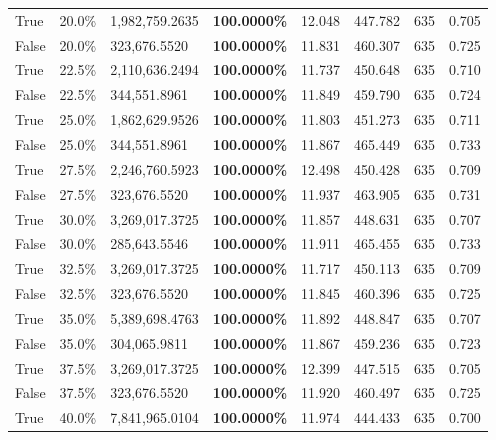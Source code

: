 \begin{table}[H]
\begin{tabular}{lllrllll}
\cline{1-8}
True & 20.0\% & 1,982,759.2635 & \bfseries \color{red} 100.0000\% & 12.048 & 447.782 & 635 & 0.705 \\
\cline{1-8}
False & 20.0\% & 323,676.5520 & \bfseries \color{red} 100.0000\% & 11.831 & 460.307 & 635 & 0.725 \\
\cline{1-8}
True & 22.5\% & 2,110,636.2494 & \bfseries \color{red} 100.0000\% & 11.737 & 450.648 & 635 & 0.710 \\
\cline{1-8}
False & 22.5\% & 344,551.8961 & \bfseries \color{red} 100.0000\% & 11.849 & 459.790 & 635 & 0.724 \\
\cline{1-8}
True & 25.0\% & 1,862,629.9526 & \bfseries \color{red} 100.0000\% & 11.803 & 451.273 & 635 & 0.711 \\
\cline{1-8}
False & 25.0\% & 344,551.8961 & \bfseries \color{red} 100.0000\% & 11.867 & 465.449 & 635 & 0.733 \\
\cline{1-8}
True & 27.5\% & 2,246,760.5923 & \bfseries \color{red} 100.0000\% & 12.498 & 450.428 & 635 & 0.709 \\
\cline{1-8}
False & 27.5\% & 323,676.5520 & \bfseries \color{red} 100.0000\% & 11.937 & 463.905 & 635 & 0.731 \\
\cline{1-8}
True & 30.0\% & 3,269,017.3725 & \bfseries \color{red} 100.0000\% & 11.857 & 448.631 & 635 & 0.707 \\
\cline{1-8}
False & 30.0\% & \color{red} 285,643.5546 & \bfseries \color{red} 100.0000\% & 11.911 & 465.455 & 635 & 0.733 \\
\cline{1-8}
True & 32.5\% & 3,269,017.3725 & \bfseries \color{red} 100.0000\% & 11.717 & 450.113 & 635 & 0.709 \\
\cline{1-8}
False & 32.5\% & 323,676.5520 & \bfseries \color{red} 100.0000\% & 11.845 & 460.396 & 635 & 0.725 \\
\cline{1-8}
True & 35.0\% & 5,389,698.4763 & \bfseries \color{red} 100.0000\% & 11.892 & 448.847 & 635 & 0.707 \\
\cline{1-8}
False & 35.0\% & 304,065.9811 & \bfseries \color{red} 100.0000\% & 11.867 & 459.236 & 635 & 0.723 \\
\cline{1-8}
True & 37.5\% & 3,269,017.3725 & \bfseries \color{red} 100.0000\% & 12.399 & 447.515 & 635 & 0.705 \\
\cline{1-8}
False & 37.5\% & 323,676.5520 & \bfseries \color{red} 100.0000\% & 11.920 & 460.497 & 635 & 0.725 \\
\cline{1-8}
True & 40.0\% & 7,841,965.0104 & \bfseries \color{red} 100.0000\% & 11.974 & 444.433 & 635 & 0.700 \\

\end{tabular}
\end{table}
